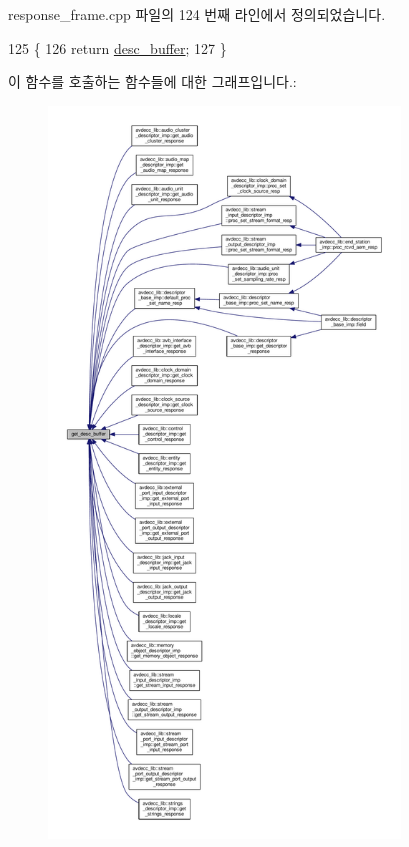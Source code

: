 response\+\_\+frame.\+cpp 파일의 124 번째 라인에서 정의되었습니다.


\begin{DoxyCode}
125 \{
126     \textcolor{keywordflow}{return} \hyperlink{classavdecc__lib_1_1response__frame_a475e9644bebeea82b09dc6a2f054fe18}{desc\_buffer};
127 \}
\end{DoxyCode}


이 함수를 호출하는 함수들에 대한 그래프입니다.\+:
\nopagebreak
\begin{figure}[H]
\begin{center}
\leavevmode
\includegraphics[height=550pt]{classavdecc__lib_1_1response__frame_a87db6e7ad7e047437cf9c9eaab873626_icgraph}
\end{center}
\end{figure}


